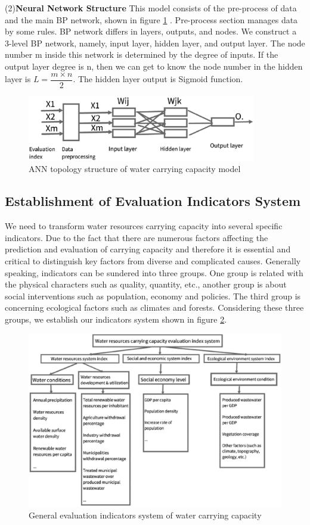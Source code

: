 (2)\textbf{Neural Network Structure}
This model consists of the pre-process of data and the main BP network, shown in figure \ref{BP} \cite{Xiangui}. Pre-process section manages data by some rules. BP network differs in layers, outputs, and nodes. We construct a 3-level BP network, namely, input layer, hidden layer, and output layer. The node number m inside this network is determined by the degree of inputs. If the output layer degree is n, then we can get to know the node number in the hidden layer is $L=\dfrac{m\times n}{2}$. The hidden layer output is Sigmoid function.
\begin{figure}[h]
\small
\centering
\includegraphics[width=10cm]{./picture/BP.eps}
\caption{ANN topology structure of water carrying capacity model} \label{BP}
\end{figure}

\subsection{Establishment of Evaluation Indicators System}
We need to transform water resources carrying capacity into several specific indicators. Due to the fact that there are numerous factors affecting the prediction and evaluation of carrying capacity and therefore it is essential and critical to distinguish key factors from diverse and complicated causes. Generally speaking, indicators can be sundered into three groups. One group is related with the physical characters such as quality, quantity, etc., another group is about social interventions such as population, economy and policies. The third group is concerning ecological factors such as climates and forests. Considering these three groups, we establish our indicators system shown in figure \ref{System}\cite{Qingwen}.
\begin{figure}[h]
\small
\centering
\includegraphics[width=12cm]{./picture/System.eps}
\caption{General evaluation indicators system of water carrying capacity} \label{System}
\end{figure}

